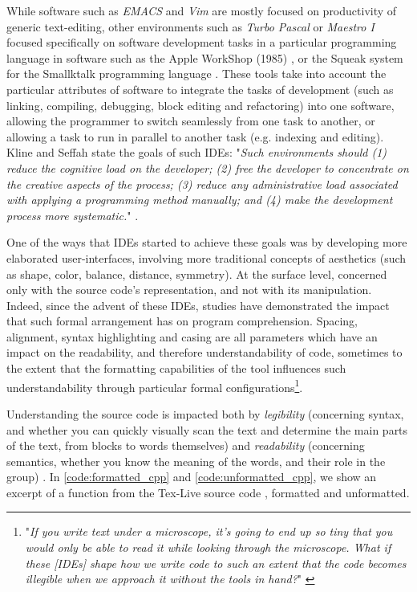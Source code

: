 While software such as \emph{EMACS} and \emph{Vim} are mostly focused on productivity of generic text-editing, other environments such as \emph{Turbo Pascal} or \emph{Maestro I} focused specifically on software development tasks in a particular programming language in software such as the Apple WorkShop (1985) \citep{west_macintosh_1987}, or the Squeak system for the Smallktalk programming language \citep{ingalls_back_1997}. These tools take into account the particular attributes of software to integrate the tasks of development (such as linking, compiling, debugging, block editing and refactoring) into one software, allowing the programmer to switch seamlessly from one task to another, or allowing a task to run in parallel to another task (e.g. indexing and editing). Kline and Seffah state the goals of such IDEs: "\emph{Such environments should (1) reduce the cognitive load on the developer; (2) free the developer to concentrate on the creative aspects of the process; (3) reduce any administrative load associated with applying a programming method manually; and (4) make the development process more systematic.}" \citep{kline_evaluation_2005}.

One of the ways that IDEs started to achieve these goals was by developing more elaborated user-interfaces, involving more traditional concepts of aesthetics (such as shape, color, balance, distance, symmetry). At the surface level, concerned only with the source code's representation, and not with its manipulation. Indeed, since the advent of these IDEs, studies have demonstrated the impact that such formal arrangement has on program comprehension\citep{oman_typographic_1990,oliveira_systematic_2022}. Spacing, alignment, syntax highlighting and casing are all parameters which have an impact on the readability, and therefore understandability of code, sometimes to the extent that the formatting capabilities of the tool influences such understandability through particular formal configurations\footnote{"\emph{If you write text under a microscope, it’s going to end up so tiny that you would only be able to read it while looking through the microscope. What if these [IDEs] shape how we write code to such an extent that the code becomes illegible when we approach it without the tools in hand?}" \citep{ball_how_2020}}.

Understanding the source code is impacted both by \emph{legibility} (concerning syntax, and whether you can quickly visually scan the text and determine the main parts of the text, from blocks to words themselves) and \emph{readability} (concerning semantics, whether you know the meaning of the words, and their role in the group) \citep{oliveira_evaluating_2020,jacques_understanding_2015}. In \ref{code:formatted_cpp} and \ref{code:unformatted_cpp}, we show an excerpt of a function from the Tex-Live source code \citep{berry_texlive_2022}, formatted and unformatted.

